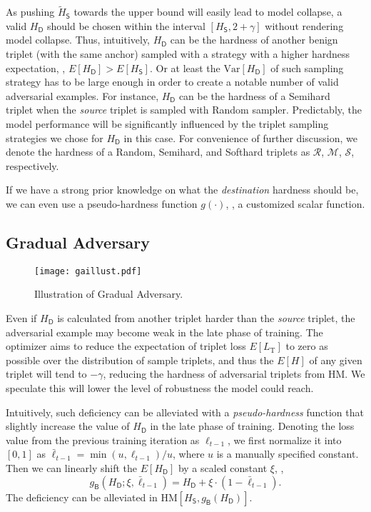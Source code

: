 \documentclass[10pt,twocolumn,letterpaper]{article}
\begin{document}
As pushing $\tilde{H}_\mathsf{S}$ towards the upper bound will easily lead to
model collapse, a valid $H_\mathsf{D}$ should be chosen within the interval
$[H_\mathsf{S},2+\gamma]$ without rendering model collapse.
%
Thus, intuitively, $H_\mathsf{D}$ can be the hardness of another benign triplet
(with the same anchor) sampled with a strategy with a higher hardness
expectation, \ie, $E[H_\mathsf{D}] > E[H_\mathsf{S}]$.
%
Or at least the $\text{Var}[H_\mathsf{D}]$ of such sampling strategy has to be
large enough in order to create a notable number of valid adversarial examples.
%
For instance, $H_\mathsf{D}$ can be the hardness of a Semihard~\cite{facenet}
triplet when the \emph{source} triplet is sampled with Random sampler.
%
Predictably, the model performance will be significantly influenced by the
triplet sampling strategies we chose for $H_\mathsf{D}$ in this case.
%
For convenience of further discussion, we denote the hardness of a Random,
Semihard, and Softhard triplets as $\mathcal{R}$,
$\mathcal{M}$, $\mathcal{S}$, respectively.

If we have a strong prior knowledge on what the \emph{destination} hardness
should be, we can even use a pseudo-hardness function $g(\cdot)$, \ie, a
customized scalar function.



\subsection{Gradual Adversary}
\label{sec:32}

\begin{figure}
	\texttt{[image: gaillust.pdf]}
	\caption{Illustration of Gradual Adversary.}
	\label{fig:ga}
\end{figure}



Even if $H_\mathsf{D}$ is calculated from another triplet harder than the
\emph{source} triplet, the adversarial example may become weak in the late
phase of training.
%
The optimizer aims to reduce the expectation of triplet
loss $E[L_\text{T}]$ to zero as possible over the distribution of sample triplets, and thus
the $E[H]$ of any given triplet will tend to $-\gamma$, reducing the
hardness of adversarial triplets from HM.
%
We speculate this will lower the level of robustness the model could reach.


Intuitively, such deficiency can be alleviated with a \emph{pseudo-hardness}
function that slightly increase the value of $H_\mathsf{D}$ in the late phase
of training.
%
Denoting the loss value from the previous training iteration as $\ell_{t-1}$,
we first normalize it into $[0,1]$ as $\bar{\ell}_{t-1}=\min(u,\ell_{t-1})/u$,
where $u$ is a manually specified constant.
%
Then we can linearly shift the $E[H_\mathsf{D}]$ by a scaled constant $\xi$,
\ie,
%
\begin{equation}
	g_\mathsf{B}(H_\mathsf{D};\xi,\bar{\ell}_{t-1}) =
	H_\mathsf{D} + \xi \cdot (1-\bar{\ell}_{t-1}).
\end{equation}
%
The deficiency can be alleviated in
$\text{HM}[H_\mathsf{S},g_\mathsf{B}(H_\mathsf{D})]$.
\end{document}
